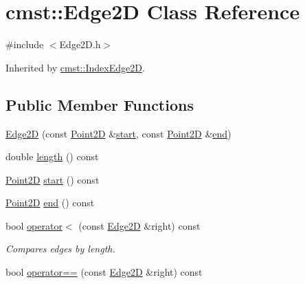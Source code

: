 \hypertarget{classcmst_1_1_edge2_d}{}\section{cmst\+:\+:Edge2D Class Reference}
\label{classcmst_1_1_edge2_d}


{\ttfamily \#include $<$Edge2\+D.\+h$>$}



Inherited by \hyperlink{classcmst_1_1_index_edge2_d}{cmst\+::\+Index\+Edge2D}.

\subsection*{Public Member Functions}
\begin{DoxyCompactItemize}
\item 
\hyperlink{classcmst_1_1_edge2_d_a0d1166315f84757395e889d3225e2ae0}{Edge2D} (const \hyperlink{classcmst_1_1_point2_d}{Point2D} \&\hyperlink{classcmst_1_1_edge2_d_ad77218c63818fe92f43033ba1487ab89}{start}, const \hyperlink{classcmst_1_1_point2_d}{Point2D} \&\hyperlink{classcmst_1_1_edge2_d_af02d43d8344759ac3709d318e26cdcee}{end})
\item 
double \hyperlink{classcmst_1_1_edge2_d_adaa859c8f6b412e1174abe8d8b429ce9}{length} () const 
\item 
\hyperlink{classcmst_1_1_point2_d}{Point2D} \hyperlink{classcmst_1_1_edge2_d_ad77218c63818fe92f43033ba1487ab89}{start} () const 
\item 
\hyperlink{classcmst_1_1_point2_d}{Point2D} \hyperlink{classcmst_1_1_edge2_d_af02d43d8344759ac3709d318e26cdcee}{end} () const 
\item 
bool \hyperlink{classcmst_1_1_edge2_d_ab710dba1b2f0a4c74d01a7b2c1211efa}{operator$<$} (const \hyperlink{classcmst_1_1_edge2_d}{Edge2D} \&right) const \hypertarget{classcmst_1_1_edge2_d_ab710dba1b2f0a4c74d01a7b2c1211efa}{}\label{classcmst_1_1_edge2_d_ab710dba1b2f0a4c74d01a7b2c1211efa}

\begin{DoxyCompactList}\small\item\em Compares edges by length. \end{DoxyCompactList}\item 
bool \hyperlink{classcmst_1_1_edge2_d_a4370b0ab916b4fd8d5ff98733ae57116}{operator==} (const \hyperlink{classcmst_1_1_edge2_d}{Edge2D} \&right) const 
\end{DoxyCompactItemize}
